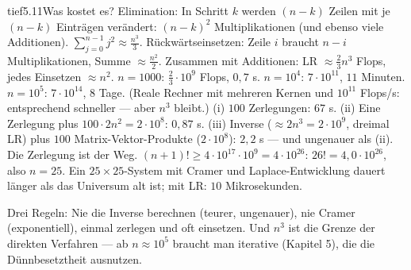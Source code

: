 \begin{loesungkarte}{tief}{5.11}{Was kostet es?}
Elimination: In Schritt $k$ werden $(n - k)$ Zeilen mit je $(n - k)$ Einträgen verändert: $(n - k)^{2}$ Multiplikationen (und ebenso viele Additionen). $\sum_{j=0}^{n-1}j^{2}\approx\frac{n^{3}}3$. Rückwärtseinsetzen: Zeile $i$ braucht $n - i$ Multiplikationen, Summe $\approx\frac{n^{2}}2$. Zusammen mit Additionen: LR $\approx\frac23n^{3}$ Flops, jedes Einsetzen $\approx n^{2}$.
$n = 1000$: $\frac23\cdot10^{9}$ Flops, $0{,}7$ s. $n = 10^{4}$: $7\cdot10^{11}$, $11$ Minuten. $n = 10^{5}$: $7\cdot10^{14}$, $8$ Tage. (Reale Rechner mit mehreren Kernen und $10^{11}$ Flops/s: entsprechend schneller --- aber $n^{3}$ bleibt.)
(i) $100$ Zerlegungen: $67$ s. (ii) Eine Zerlegung plus $100\cdot2n^{2} = 2\cdot10^{8}$: $0{,}87$ s. (iii) Inverse ($\approx2n^{3} = 2\cdot10^{9}$, dreimal LR) plus $100$ Matrix-Vektor-Produkte ($2\cdot10^{8}$): $2{,}2$ s --- und ungenauer als (ii). Die Zerlegung ist der Weg.
$(n + 1)!\ge4\cdot10^{17}\cdot10^{9} = 4\cdot10^{26}$: $26! = 4{,}0\cdot10^{26}$, also $n = 25$. Ein $25\times25$-System mit Cramer und Laplace-Entwicklung dauert länger als das Universum alt ist; mit LR: $10$ Mikrosekunden.
\begin{mitnehmen}\kastentext
Drei Regeln: Nie die Inverse berechnen (teurer, ungenauer), nie Cramer (exponentiell), einmal zerlegen und oft einsetzen. Und $n^{3}$ ist die Grenze der direkten Verfahren --- ab $n\approx10^{5}$ braucht man iterative (Kapitel 5), die die Dünnbesetztheit ausnutzen.
\end{mitnehmen}
\end{loesungkarte}

